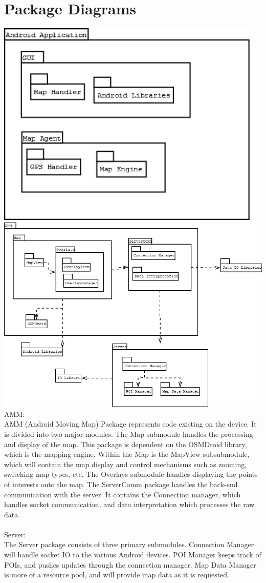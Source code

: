 \documentclass{article}
\begin{document}
\section{Package Diagrams}
\includegraphics[keepaspectratio, width=5in]{ProjectUMLDiagram.png} \\
\includegraphics[keepaspectratio, width=7in]{package.png} \\
AMM:\\
AMM (Android Moving Map) Package represents code existing on the device.  It is divided into two major modules.  The Map submodule handles the processing and display of the map.  This package is dependent on the OSMDroid library, which is the mapping engine.
Within the Map is the MapView subsubmodule, which will contain the map display and control mechanisms such as zooming, switching map types, etc.  The Overlays submodule handles displaying the points of interests onto the map.  The ServerComm package handles the back-end communication with the server.  It contains the Connection manager, which handles socket communication, and data interpretation which processes the raw data.\\ \\
Server:\\
The Server package consists of three primary submodules.  Connection Manager will handle socket IO to the various Android devices.  POI Manager keeps track of POIs, and pushes updates through the connection manager.  Map Data Manager is more of a resource pool, and will provide map data as it is requested.
\end{document}
